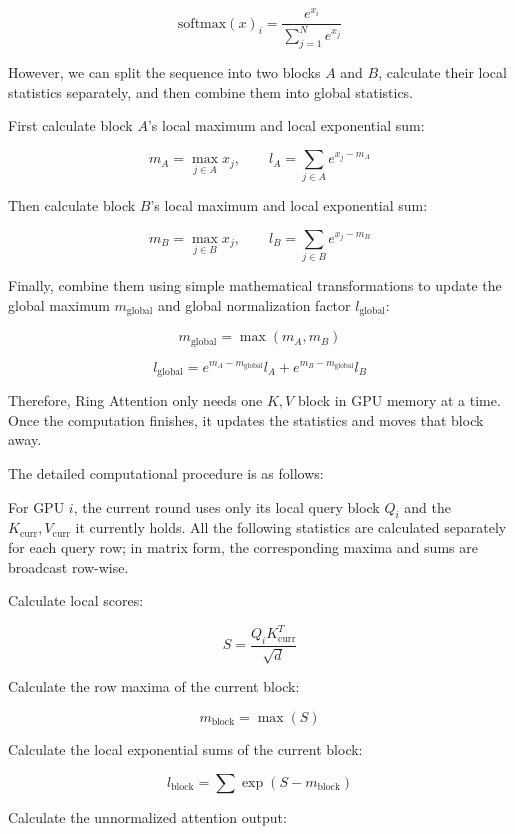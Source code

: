 \[
\mathrm{softmax}(x)_i = \frac{e^{x_i}}{\sum_{j=1}^{N} e^{x_j}}
\]

However, we can split the sequence into two blocks \(A\) and \(B\), calculate their local statistics separately, and then combine them into global statistics.

First calculate block \(A\)'s local maximum and local exponential sum:

\[
m_A = \max_{j \in A} x_j,\qquad
l_A = \sum_{j \in A} e^{x_j - m_A}
\]

Then calculate block \(B\)'s local maximum and local exponential sum:

\[
m_B = \max_{j \in B} x_j,\qquad
l_B = \sum_{j \in B} e^{x_j - m_B}
\]

Finally, combine them using simple mathematical transformations to update the global maximum \(m_{\mathrm{global}}\) and global normalization factor \(l_{\mathrm{global}}\):

\[
m_{\mathrm{global}} = \max(m_A, m_B)
\]

\[
l_{\mathrm{global}} =
e^{m_A - m_{\mathrm{global}}} l_A
+ e^{m_B - m_{\mathrm{global}}} l_B
\]

Therefore, Ring Attention only needs one \(K, V\) block in GPU memory at a time. Once the computation finishes, it updates the statistics and moves that block away.

The detailed computational procedure is as follows:

For GPU \(i\), the current round uses only its local query block \(Q_i\) and the \(K_{\mathrm{curr}}, V_{\mathrm{curr}}\) it currently holds. All the following statistics are calculated separately for each query row; in matrix form, the corresponding maxima and sums are broadcast row-wise.

Calculate local scores:

\[
S = \frac{Q_i K_{\mathrm{curr}}^T}{\sqrt{d}}
\]

Calculate the row maxima of the current block:

\[
m_{\mathrm{block}} = \max(S)
\]

Calculate the local exponential sums of the current block:

\[
l_{\mathrm{block}} = \sum \exp(S - m_{\mathrm{block}})
\]

Calculate the unnormalized attention output:

